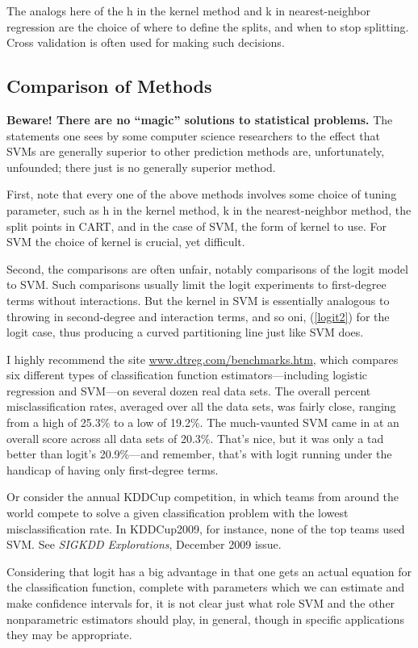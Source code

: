 The analogs here of the h in the kernel method and k in nearest-neighbor
regression are the choice of where to define the splits, and when to stop
splitting.  Cross validation is often used for making such decisions.

\subsection{Comparison of Methods}

{\bf Beware!  There are no ``magic'' solutions to statistical problems.}
The statements one sees by some computer science researchers to the
effect that SVMs are generally superior to other prediction methods are,
unfortunately, unfounded; there just is no generally superior method.  

First, note that every one of the above methods involves some choice of
tuning parameter, such as h in the kernel method, k in the
nearest-neighbor method, the split points in CART, and in the case of
SVM, the form of kernel to use.  For SVM the choice of kernel is
crucial, yet difficult.

Second, the comparisons are often unfair, notably comparisons of the
logit model to SVM.  Such comparisons usually limit the logit
experiments to first-degree terms without interactions.  But the kernel
in SVM is essentially analogous to throwing in second-degree and
interaction terms, and so oni, (\ref{logit2}) for the logit case, thus
producing a curved partitioning line just like SVM does.

I highly recommend the site \url{www.dtreg.com/benchmarks.htm}, which
compares six different types of classification function
estimators---including logistic regression and SVM---on several dozen
real data sets.  The overall percent misclassification rates, averaged
over all the data sets, was fairly close, ranging from a high of 25.3\%
to a low of 19.2\%.  The much-vaunted SVM came in at an overall score
across all data sets of 20.3\%.  That's nice, but it was only a tad
better than logit's 20.9\%---and remember, that's with logit running
under the handicap of having only first-degree terms.

Or consider the annual KDDCup competition, in which teams from around
the world compete to solve a given classification problem with the
lowest misclassification rate.  In KDDCup2009, for instance, none of the
top teams used SVM.  See {\it SIGKDD Explorations}, December 2009 issue.

Considering that logit has a big advantage in that one gets an actual
equation for the classification function, complete with parameters which
we can estimate and make confidence intervals for, it is not clear just
what role SVM and the other nonparametric estimators should play, in
general, though in specific applications they may be appropriate.

